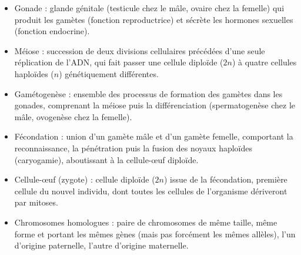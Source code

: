 \documentclass[11pt]{article}
\newcommand{\cle}[1]{{\popxbold\color{popdark}#1}}
\begin{document}
\begin{corrige}
\begin{itemize}
\item \cle{Gonade} : glande génitale (testicule chez le mâle, ovaire chez la femelle) qui produit les gamètes (fonction reproductrice) et sécrète les hormones sexuelles (fonction endocrine).
\item \cle{Méiose} : succession de deux divisions cellulaires précédées d'une seule réplication de l'ADN, qui fait passer une cellule diploïde ($2n$) à quatre cellules haploïdes ($n$) génétiquement différentes.
\item \cle{Gamétogenèse} : ensemble des processus de formation des gamètes dans les gonades, comprenant la méiose puis la différenciation (spermatogenèse chez le mâle, ovogenèse chez la femelle).
\item \cle{Fécondation} : union d'un gamète mâle et d'un gamète femelle, comportant la reconnaissance, la pénétration puis la fusion des noyaux haploïdes (caryogamie), aboutissant à la cellule-œuf diploïde.
\item \cle{Cellule-œuf} (zygote) : cellule diploïde ($2n$) issue de la fécondation, première cellule du nouvel individu, dont toutes les cellules de l'organisme dériveront par mitoses.
\item \cle{Chromosomes homologues} : paire de chromosomes de même taille, même forme et portant les mêmes gènes (mais pas forcément les mêmes allèles), l'un d'origine paternelle, l'autre d'origine maternelle.
\end{itemize}
\end{corrige}
\end{document}
